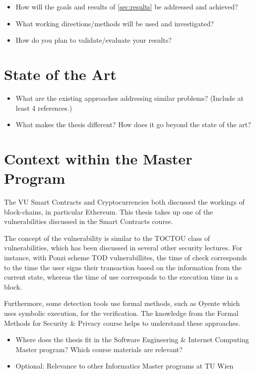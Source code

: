 \documentclass[paper=a4,fontsize=11pt,oneside,titlepage]{scrartcl}
\begin{document}
\begin{itemize}
\item How will the goals and results of \autoref{sec:results} be addressed and achieved?
\item What working directions/methods will be used and investigated?
\item How do you plan to validate/evaluate your results?
\end{itemize}

\section{State of the Art}
\label{sec:relatedWork}

\begin{itemize}
\item What are the existing approaches addressing similar problems? (Include at least 4 references.)
\item What makes the thesis different? How does it go beyond the state of the art?
\end{itemize}

\section{Context within the Master Program}
\label{sec:masterProgram}

The VU Smart Contracts and Cryptocurrencies both discussed the workings of block\hyp{}chains, in particular Ethereum. This thesis takes up one of the vulnerabilities discussed in the Smart Contracts course.

The concept of the vulnerability is similar to the TOCTOU class of vulnerabilities, which has been discussed in several other security lectures. For instance, with Ponzi scheme TOD vulnerabillites, the time of check corresponds to the time the user signs their transaction based on the information from the current state, whereas the time of use corresponds to the execution time in a block.

Furthermore, some detection tools use formal methods, such as Oyente which uses symbolic execution, for the verification. The knowledge from the Formal Methods for Security \& Privacy course helps to understand these approaches.

\begin{itemize}
\item Where does the thesis fit in the Software Engineering \& Internet Computing
Master program? Which course materials are relevant?
\item Optional: Relevance to other Informatics Master programs at TU Wien
\end{itemize}

\newpage


\end{document}
